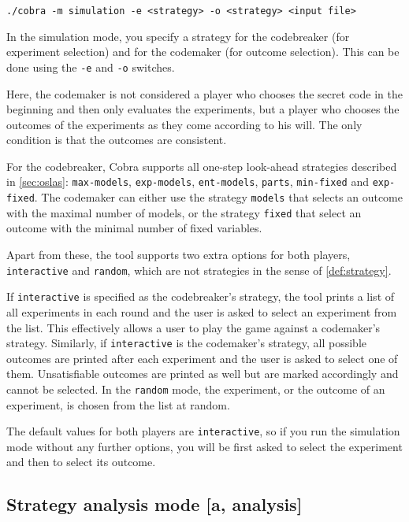\centerline{\texttt{./cobra -m simulation -e <strategy> -o <strategy> <input file> }}

In the simulation mode, you specify a strategy
  for the codebreaker (for experiment selection)
  and for the codemaker (for outcome selection).
This can be done using the \texttt{-e} and \texttt{-o} switches.

Here, the codemaker is not considered a player who chooses
  the secret code in the beginning and then only evaluates the experiments,
  but a player who chooses the outcomes
  of the experiments as they come according to his will.
The only condition is that the outcomes are consistent.

For the codebreaker, Cobra supports all one-step look-ahead strategies described in
\autoref{sec:oslas}: \texttt{max-models}, \texttt{exp-models},
 \texttt{ent-models}, \texttt{parts}, \texttt{min-fixed} and \texttt{exp-fixed}.
The codemaker can either use the strategy \texttt{models} that selects an outcome
  with the maximal number of models, or the strategy \texttt{fixed} that
  select an outcome with the minimal number of fixed variables.

Apart from these, the tool supports two extra options for both players,
  \texttt{interactive} and \texttt{random},
  which are not strategies in the sense of \autoref{def:strategy}.

If \texttt{interactive} is specified as the codebreaker's strategy,
  the tool prints a list of all experiments in each round
  and the user is asked
  to select an experiment from the list.
This effectively allows a user to play the game against a codemaker's strategy.
Similarly, if \texttt{interactive} is the codemaker's strategy, all possible outcomes
  are printed after each experiment and the user is asked to select one of them.
Unsatisfiable outcomes are printed as well but are marked accordingly
  and cannot be selected.
In the \texttt{random} mode, the experiment, or the outcome of an experiment, is
  chosen from the list at random.

The default values for both players are \texttt{interactive},
  so if you run the simulation mode without any further options,
  you will be first asked to select the experiment and then to select its outcome.

\subsection{Strategy analysis mode [a, analysis]}

